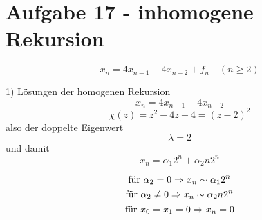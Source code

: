 \section*{Aufgabe 17 - inhomogene Rekursion}
\[ x_{n} = 4x_{n-1} - 4x_{n-2} + f_{n} \quad (n\geq 2) \]
\begin{paragraph}{1)}
  Lösungen der homogenen Rekursion
  \[ x_{n} = 4x_{n-1} - 4x_{n-2} \]
  \[ \chi(z) = z^{2} - 4z + 4 = (z - 2)^{2} \]
  also der doppelte Eigenwert
  \[ \lambda = 2 \]
  und damit
  \[ x_{n} = \alpha_{1}2^{n} + \alpha_{2}n2^{n} \]

  \[ \textnormal{für } \alpha_{2} = 0 \Rightarrow x_{n} \sim \alpha_{1}2^{n} \]
  \[ \textnormal{für } \alpha_{2} \not= 0 \Rightarrow x_{n} \sim \alpha_{2}n2^{n} \]
  \[ \textnormal{für } x_{0} = x_{1} = 0 \Rightarrow x_{n} = 0 \]
\end{paragraph}

